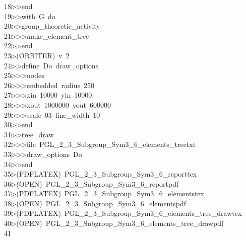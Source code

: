 \begin{tabbing}
18\>$\triangleright$\>$\triangleright$\>end\ \\[0pt]
19\>$\triangleright$\>$\triangleright$\>with\ G\ do\ \\[0pt]
20\>$\triangleright$\>$\triangleright$\>group\_theoretic\_activity\ \\[0pt]
21\>$\triangleright$\>$\triangleright$\>$\triangleright$\>make\_element\_tree\ \\[0pt]
22\>$\triangleright$\>$\triangleright$\>end\\[0pt]
23\>$\triangleright$\>(ORBITER)\ v\ 2\ \\[0pt]
24\>$\triangleright$\>$\triangleright$\>define\ Do\ draw\_options\ \\[0pt]
25\>$\triangleright$\>$\triangleright$\>$\triangleright$\>nodes\ \\[0pt]
26\>$\triangleright$\>$\triangleright$\>$\triangleright$\>embedded\ radius\ 250\ \\[0pt]
27\>$\triangleright$\>$\triangleright$\>$\triangleright$\>xin\ 10000\ yin\ 10000\ \\[0pt]
28\>$\triangleright$\>$\triangleright$\>$\triangleright$\>xout\ 1000000\ yout\ 600000\ \\[0pt]
29\>$\triangleright$\>$\triangleright$\>$\triangleright$\>scale\ 03\ line\_width\ 10\ \\[0pt]
30\>$\triangleright$\>$\triangleright$\>end\ \\[0pt]
31\>$\triangleright$\>$\triangleright$\>tree\_draw\ \\[0pt]
32\>$\triangleright$\>$\triangleright$\>$\triangleright$\>file\ PGL\_2\_3\_Subgroup\_Sym3\_6\_elements\_treetxt\ \\[0pt]
33\>$\triangleright$\>$\triangleright$\>$\triangleright$\>draw\_options\ Do\ \\[0pt]
34\>$\triangleright$\>$\triangleright$\>end\\[0pt]
35\>$\triangleright$\>(PDFLATEX)\ PGL\_2\_3\_Subgroup\_Sym3\_6\_reporttex\\[0pt]
36\>$\triangleright$\>(OPEN)\ PGL\_2\_3\_Subgroup\_Sym3\_6\_reportpdf\\[0pt]
37\>$\triangleright$\>(PDFLATEX)\ PGL\_2\_3\_Subgroup\_Sym3\_6\_elementstex\\[0pt]
38\>$\triangleright$\>(OPEN)\ PGL\_2\_3\_Subgroup\_Sym3\_6\_elementspdf\\[0pt]
39\>$\triangleright$\>(PDFLATEX)\ PGL\_2\_3\_Subgroup\_Sym3\_6\_elements\_tree\_drawtex\\[0pt]
40\>$\triangleright$\>(OPEN)\ PGL\_2\_3\_Subgroup\_Sym3\_6\_elements\_tree\_drawpdf\\[0pt]
41\>\end{tabbing}
